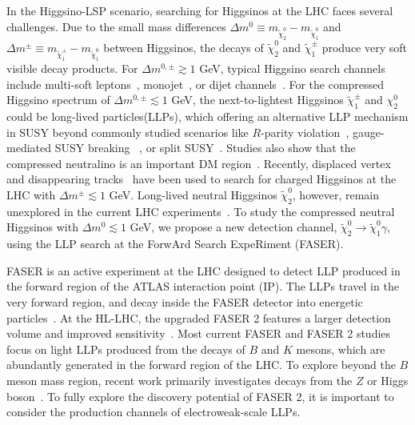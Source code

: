 \documentclass[
    twocolumn,
    superscriptaddress,
    amsmath, 
    amssymb,
    aps,
    reprint,
    floatfix
]{revtex4-2}
\newcommand{\Wei}[1]{\textcolor{green2} {Wei: #1}}
\newcommand{\px}[1]{\textcolor{blue} {PX: {\bf Comment:} {\it #1}}}
\begin{document}
In the Higgsino-LSP scenario, searching for Higgsinos at the LHC faces several challenges. Due to the small mass differences 
$\Delta m^0 \equiv m_{\tilde{\chi}_2^0} - m_{\tilde{\chi}_1^0}$ and
$\Delta m^\pm \equiv m_{\tilde{\chi}_1^\pm} - m_{\tilde{\chi}_1^0}$ 
between Higgsinos, the decays of $\tilde{\chi}_2^0$ and $\tilde{\chi}_1^\pm$ produce very soft visible decay products. For $\Delta m^{0,\pm} \gtrsim 1$ GeV, typical Higgsino search channels include multi-soft leptons~\cite{ATLAS:2021moa, ATLAS:2019lng, CMS:2021edw, CMS-PAS-EXO-23-017}, monojet~\cite{ATLAS:2021kxv, Buanes:2022wgm, CMS:2021far, Agin:2023yoq}, or dijet channels~\cite{ATLAS:2024woy}.  
For the compressed Higgsino spectrum of $\Delta m^{0,\pm} \lesssim 1$ GeV, the next-to-lightest Higgsinos $\tilde{\chi}_1^{\pm}$ and $\chi_2^0$ could be long-lived particles(LLPs), which offering an alternative LLP mechanism in SUSY beyond commonly studied scenarios like $R$-parity violation~\cite{ATLAS:2015oan}, gauge-mediated SUSY breaking ~\cite{CMS:2024trg}, or split SUSY~\cite{CMS:2024trg}. Studies also show that the compressed neutralino is an important DM region~\cite{Martin:2007gf}. Recently, displaced vertex~\cite{ATLAS:2024umc, CMS:2025twk} and disappearing tracks~\cite{ATLAS:2022rme, CMS:2023mny} have been used to search for charged Higgsinos at the LHC with $\Delta m^\pm \lesssim 1$ GeV.  
Long-lived neutral Higgsinos $\tilde{\chi}_2^0$, however, remain unexplored in the current LHC experiments~\cite{ATLAS:2024woy}.
To study the compressed neutral Higgsinos with $\Delta m^0 \lesssim 1$ GeV, we propose a new detection channel, $\tilde{\chi}_2^0 \to \tilde{\chi}_1^0 \gamma$, using the LLP search at the ForwArd Search ExpeRiment (FASER). 
 

FASER is an active experiment at the LHC designed to detect LLP produced in the forward region of the ATLAS interaction point (IP). 
The LLPs travel in the very forward region,  and decay inside the FASER detector into  energetic particles~\cite{Feng:2017uoz,FASER:2018ceo, FASER:2018bac, FASER:2022hcn, FASER:2021ljd,FASER:2021cpr}. 
At the HL-LHC, the upgraded FASER 2 features a larger detection volume and improved sensitivity~\cite{FASER:2018eoc,Anchordoqui:2021ghd,Feng:2022inv}. 
Most current FASER and FASER 2 studies focus on light LLPs produced from the decays of $B$ and $K$ mesons, which are abundantly generated in the forward region of the LHC. To explore beyond the $B$ meson mass region, recent work primarily investigates decays from the $Z$ or Higgs boson~\cite{Helo:2018qej}. 
To fully explore the discovery potential of FASER 2, it is important to consider the production channels of electroweak-scale LLPs.
\end{document}
